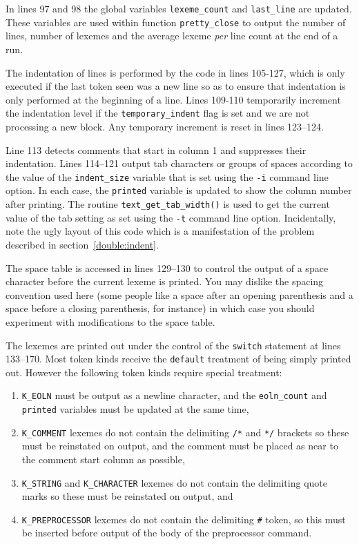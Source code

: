 In lines 97 and 98 the global variables \verb+lexeme_count+ and
\verb+last_line+ are updated. These variables are used within function
\verb+pretty_close+ to output the number of lines, number of lexemes and
the average lexeme {\em per} line count at the end of a run.

The indentation of lines is performed by the code in lines 105-127,
which is only executed if the last token seen was a new line so as to
ensure that indentation is only performed at the beginning of a line. 
Lines 109-110 temporarily increment the indentation level if the
\verb+temporary_indent+ flag is set and we are not processing a new
block. Any temporary increment is reset  in lines 123--124. 

Line 113 detects comments that start in column 1 and suppresses their
indentation. Lines 114--121 output tab characters or groups of spaces
according to the value of the \verb+indent_size+ variable that is set
using the {\tt -i} command line option. In each case, the {\tt printed}
variable is updated to show the column number after printing. The routine
\verb+text_get_tab_width()+ is used to get the current value of the tab
setting as set using the {\tt -t} command line option. Incidentally, note the ugly layout
of this code which is a manifestation of the problem described in section~\ref{double:indent}.

The space table is accessed in lines 129--130 to control the output of a space
character before the current lexeme is printed. You may dislike the spacing convention used
here (some people like a space after an opening parenthesis and a space before a 
closing parenthesis, for instance) in which case you should
experiment with modifications to the space table.

The lexemes are printed out under the control of the {\tt switch} statement at lines
133--170. Most token kinds receive the {\tt default} treatment of being simply
printed out. However the following token kinds require special treatment:
\begin{enumerate}
\item \verb+K_EOLN+ must be output as a newline character, and the \verb+eoln_count+ and
\verb+printed+ variables must be updated at the same time,
\item \verb+K_COMMENT+ lexemes do not contain the delimiting \verb+/*+ and \verb+*/+ brackets
so these must be reinstated on output, and the comment must be placed as
near to the comment start column as possible,
\item \verb+K_STRING+ and \verb+K_CHARACTER+
lexemes do not contain the delimiting quote marks
so these must be reinstated on output, and
\item \verb+K_PREPROCESSOR+ lexemes do not contain the delimiting \verb+#+ token, so this
must be inserted before output of the body of the preprocessor command.
\end{enumerate}

